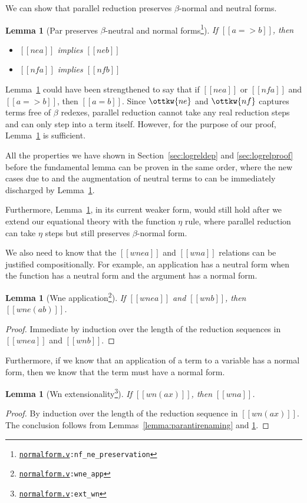 \documentclass[\ifpublic nolinenum\else\fi,online,OA]{jfp}
\newcommand{\dotv}[2]{\href{#1}{\texttt{#1}}{\texttt{:#2}}}
\newtheorem{lemma}[theorem]{Lemma}
\theoremstyle{definition}
\begin{document}
We can show that parallel reduction preserves $\beta$-normal and
neutral forms.
\begin{lemma}[Par preserves $\beta$-neutral and normal forms\footnote{\dotv{normalform.v}{nf\_ne\_preservation}}]
  \label{lemma:parnenf}
  If $[[a => b]]$, then
  \begin{itemize}
  \item $[[ne a]]$ implies $[[ne b]]$
  \item $[[nf a]]$ implies $[[nf b]]$
  \end{itemize}
\end{lemma}
Lemma~\ref{lemma:parnenf} could have been strengthened to say that if
$[[ne a]]$ or $[[nf a]]$ and $[[a => b]]$, then $[[a = b]]$. Since
$\ottkw{ne}$ and $\ottkw{nf}$ captures terms free of $\beta$ redexes, parallel
reduction cannot take any real reduction steps and can only step into a term
itself. However, for the purpose of our proof, Lemma~\ref{lemma:parnenf} is
sufficient.

All the properties we have shown in
Section~\ref{sec:logreldep} and \ref{sec:logrelproof} before the fundamental
lemma can be proven in the same order, where the new cases due to 
and the augmentation of neutral terms to  can be
immediately discharged by Lemma~\ref{lemma:parnenf}.

Furthermore, Lemma~\ref{lemma:parnenf}, in its current weaker form, would
still hold after we extend our equational theory with the function $\eta$
rule, where parallel reduction can take $\eta$ steps but still preserves
$\beta$-normal form.

We also need to know that the $[[wne a]]$ and $[[wn a]]$ relations can be
justified compositionally. For example, an application has a neutral form when
the function has a neutral form and the argument has a normal form.

\begin{lemma}[Wne application\footnote{\dotv{normalform.v}{wne\_app}}]
  \label{lemma:wnewn}
  If $[[wne a]]$ and $[[wn b]]$, then $[[wne (a b)]]$.
\end{lemma}
\begin{proof}
  Immediate by induction over the length of the reduction sequences in
  $[[wne a]]$ and $[[wn b]]$.
\end{proof}

Furthermore, if we know that an application of a term to a variable
has a normal form, then we know that the term must have a normal form.
\begin{lemma}[Wn extensionality\footnote{\dotv{normalform.v}{ext\_wn}}]
  \label{lemma:extwn}
  If $[[wn (a x)]]$, then $[[wn a]]$.
\end{lemma}
\begin{proof}
  By induction over the length of the reduction sequence in $[[wn (a
  x)]]$. The conclusion follows from Lemmas~\ref{lemma:parantirenaming} and
  \ref{lemma:parnenf}.
\end{proof}
\end{document}
